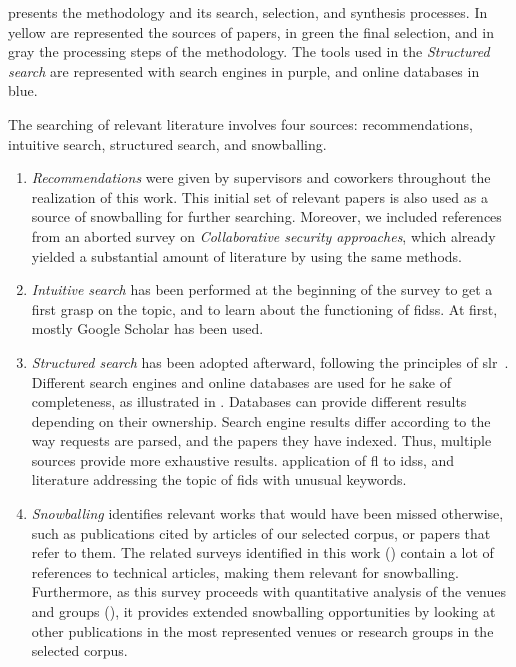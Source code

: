  presents the methodology and its search, selection, and synthesis processes.
In yellow are represented the sources of papers, in green
the final selection, and in gray the processing steps of the methodology.
The tools used in the \emph{Structured search} are represented with search engines in purple, and online databases in blue.

The searching of relevant literature involves four sources: recommendations, intuitive search, structured search, and snowballing.
\begin{enumerate}[(1)]
  \item \emph{Recommendations} were given by supervisors and coworkers throughout the realization of this work.
  This initial set of relevant papers is also used as a source of snowballing for further searching.
  Moreover, we included references from an aborted survey on \emph{Collaborative security approaches}, which already yielded a substantial amount of literature by using the same methods.
  \item \emph{Intuitive search} has been performed at the beginning of the survey to get a first grasp on the topic, and to learn about the functioning of \glspl{fids}.
  At first, mostly Google Scholar has been used.
  \item \emph{Structured search} has been adopted afterward, following the principles of \gls{slr}~\cite{kitchenham_Guidelinesperformingsystematic_2007}.
  Different search engines and online databases are used for he sake of completeness, as illustrated in . Databases can provide different results depending on their ownership.
  Search engine results differ according to the way requests are parsed, and the papers they have indexed.
  Thus, multiple sources provide more exhaustive results.
   application of \gls{fl} to \glspl{ids}, and  literature addressing the topic of \gls{fids} with unusual keywords.
  \item \emph{Snowballing} identifies relevant works that would have been missed otherwise, such as publications cited by articles of our selected corpus, or papers that refer to them.
  The related surveys identified in this work () contain a lot of references to technical articles, making them relevant for snowballing.
  Furthermore, as this survey proceeds with quantitative analysis of the venues and groups (), it provides extended snowballing opportunities by looking at other publications in the most represented venues or research groups in the selected corpus.

\end{enumerate}

